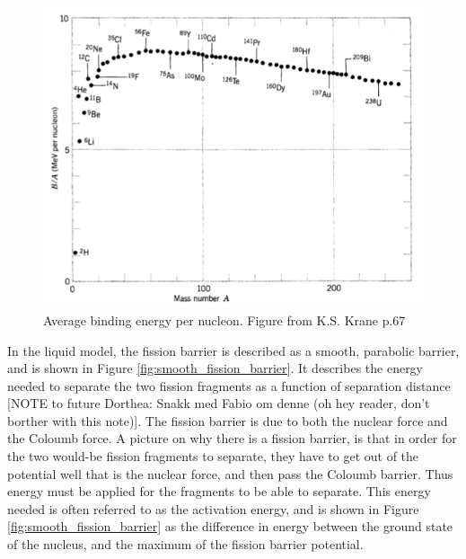 \documentclass[]{article}
\begin{document}
\begin{figure} [tbp]
	\centering
	\includegraphics[scale=0.6]{binding_energy_per_nucleon.png}
	\caption{Average binding energy per nucleon. Figure from K.S. Krane p.67 \cite{Krane1988}}
	\label{fig:binding_energy_per_nucleon}
\end{figure}


 \noindent In the liquid model, the fission barrier is described as a smooth, parabolic barrier, and is shown in Figure \ref{fig:smooth_fission_barrier}. It describes the energy needed to separate the two fission fragments as a function of separation distance \cite{Krane1988} [NOTE to future Dorthea: Snakk med Fabio om denne (oh hey reader, don't borther with this note)]. The fission barrier is due to both the nuclear force and the Coloumb force. A picture on why there is a fission barrier, is that in order for the two would-be fission fragments to separate, they have to get out of the potential well that is the nuclear force, and then pass the Coloumb barrier. Thus energy must be applied for the fragments to be able to separate. This energy needed is often referred to as the activation energy, and is shown in Figure \ref{fig:smooth_fission_barrier} as the difference in energy between the ground state of the nucleus, and the maximum of the fission barrier potential. 
 
 \par
 \vspace{3mm}
 
\end{document}
